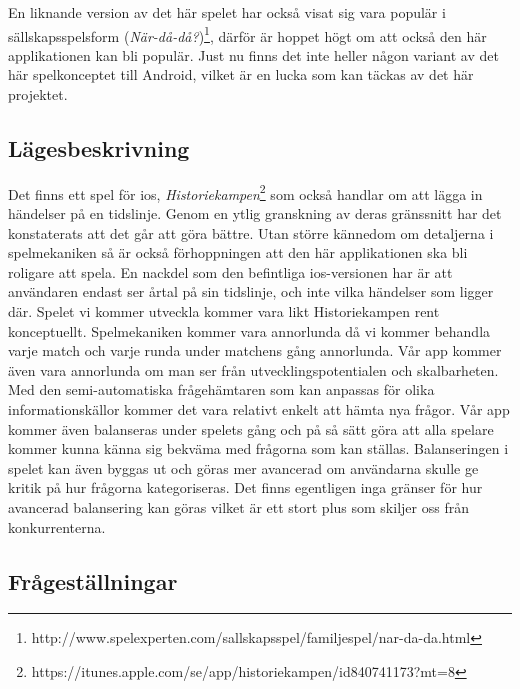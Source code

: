 \documentclass[swedish,12pt,a4paper]{article}
\begin{document}
En liknande version av det här spelet har också visat sig vara populär i sällskapsspelsform (\textit{När-då-då?})\footnote{http://www.spelexperten.com/sallskapsspel/familjespel/nar-da-da.html}, därför är hoppet högt om att också den här applikationen kan bli populär. Just nu finns det inte heller någon variant av det här spelkonceptet till Android, vilket är en lucka som kan täckas av det här projektet.

\subsection{Lägesbeskrivning}
Det finns ett spel för ios, \textit{Historiekampen}\footnote{https://itunes.apple.com/se/app/historiekampen/id840741173?mt=8} som också handlar om att lägga in händelser på en tidslinje. Genom en ytlig granskning av deras gränssnitt har det konstaterats att det går att göra bättre. Utan större kännedom om detaljerna i spelmekaniken så är också förhoppningen att den här applikationen ska bli roligare att spela. En nackdel som den befintliga ios-versionen har är att användaren endast ser årtal på sin tidslinje, och inte vilka händelser som ligger där.
Spelet vi kommer utveckla kommer vara likt Historiekampen rent konceptuellt. Spelmekaniken kommer vara annorlunda då vi kommer behandla varje match och varje runda under matchens gång annorlunda. Vår app kommer även vara annorlunda om man ser från utvecklingspotentialen och skalbarheten. Med den semi-automatiska frågehämtaren som kan anpassas för olika informationskällor kommer det vara relativt enkelt att hämta nya frågor. Vår app kommer även balanseras under spelets gång och på så sätt göra att alla spelare kommer kunna känna sig bekväma med frågorna som kan ställas. Balanseringen i spelet kan även byggas ut och göras mer avancerad om användarna skulle ge kritik på hur frågorna kategoriseras. Det finns egentligen inga gränser för hur avancerad balansering kan göras vilket är ett stort plus som skiljer oss från konkurrenterna.  

\subsection{Frågeställningar}
\end{document}
